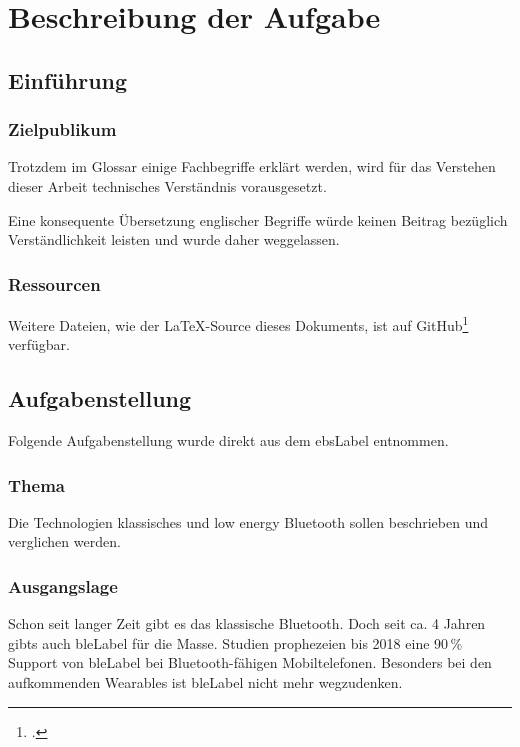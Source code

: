 \chapter{Beschreibung der Aufgabe}

\section{Einführung}
\subsection{Zielpublikum}
Trotzdem im Glossar einige Fachbegriffe erklärt werden, wird für das Verstehen dieser Arbeit technisches Verständnis vorausgesetzt.

Eine konsequente Übersetzung englischer Begriffe würde keinen Beitrag bezüglich Verständlichkeit leisten und wurde daher weggelassen.

\subsection{Ressourcen}
Weitere Dateien, wie der \LaTeX-Source dieses Dokuments, ist auf GitHub\footcite{GitHub_ble-seminar_2015-04-17} verfügbar.

\section{Aufgabenstellung}
Folgende Aufgabenstellung wurde direkt aus dem \gls{ebsLabel} entnommen.

\subsection{Thema}
Die Technologien klassisches und low energy Bluetooth sollen beschrieben und verglichen werden.

\subsection{Ausgangslage}
Schon seit langer Zeit gibt es das klassische Bluetooth. Doch seit ca. 4 Jahren gibts auch \gls{bleLabel} für die Masse. Studien prophezeien bis 2018 eine 90\,\% Support von \gls{bleLabel} bei Bluetooth-fähigen Mobiltelefonen.
Besonders bei den aufkommenden Wearables ist \gls{bleLabel} nicht mehr wegzudenken.

